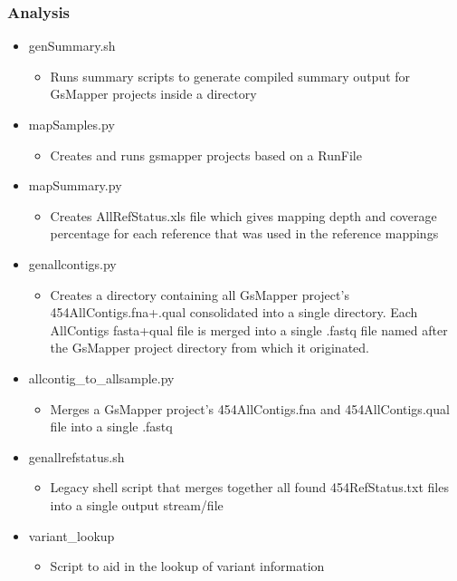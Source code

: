 \documentclass{article}
\begin{document}
\subsubsection{Analysis}
 \begin{itemize}
 \item genSummary.sh
  \begin{itemize}
   \item Runs summary scripts to generate compiled summary output for GsMapper projects inside a directory
  \end{itemize}
 \item mapSamples.py
  \begin{itemize}
   \item Creates and runs gsmapper projects based on a RunFile
  \end{itemize}
 \item mapSummary.py
  \begin{itemize}
   \item Creates AllRefStatus.xls file which gives mapping depth and coverage percentage for each reference that was used in the reference mappings
  \end{itemize}
 \item genallcontigs.py
  \begin{itemize}
   \item Creates a directory containing all GsMapper project's 454AllContigs.fna+.qual consolidated into a single directory. Each AllContigs fasta+qual file is merged into a single .fastq file named after the GsMapper project directory from which it originated.
   \end{itemize}
 \item allcontig\_to\_allsample.py
  \begin{itemize}
   \item Merges a GsMapper project's 454AllContigs.fna and 454AllContigs.qual file into a single .fastq
  \end{itemize}
 \item genallrefstatus.sh
  \begin{itemize}
   \item Legacy shell script that merges together all found 454RefStatus.txt files into a single output stream/file
  \end{itemize}
 \item variant\_lookup
  \begin{itemize}
   \item Script to aid in the lookup of variant information
  \end{itemize}
 \end{itemize}
\end{document}
